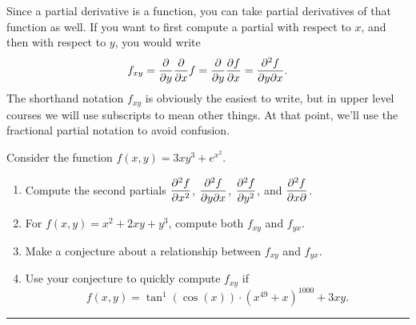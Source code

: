 Since a partial derivative is a function, you can take partial derivatives of that function as well.  If you want to first compute a partial with respect to $x$, and then with respect to $y$, you would write $$f_{xy}=\displaystyle\frac{\partial}{\partial y}\frac{\partial}{\partial x}f = \frac{\partial}{\partial y}\frac{\partial f}{\partial x} = \frac{\partial^2 f}{\partial y \partial x}.$$
The shorthand notation $f_{xy}$ is obviously the easiest to write, but in upper level courses we will use subscripts to mean other things. At that point, we'll use the fractional partial notation to avoid confusion.


\begin{problem}
Consider the function $f(x,y)=3xy^3+e^{x^2}.$
\begin{enumerate}
 \item Compute the second partials $\displaystyle \frac{\partial^2 f}{ \partial x^2}$, $\displaystyle\frac{\partial^2 f}{\partial y \partial x}$, $\displaystyle\frac{\partial^2 f}{\partial y^2}$, and $\displaystyle\frac{\partial^2 f}{\partial x \partial }$.
 \item For $f(x,y)=x^2+2xy+y^3$, compute both $f_{xy}$ and $f_{yx}$.  
 \item Make a conjecture about a relationship between $f_{xy}$ and $f_{yx}$.
 \item Use your conjecture to quickly compute $f_{xy}$ if $$f(x,y)=\tan^{1}(\cos(x))\cdot (x^{49}+x)^{1000}+3xy.$$ 
\end{enumerate}
\hrule\end{problem}



